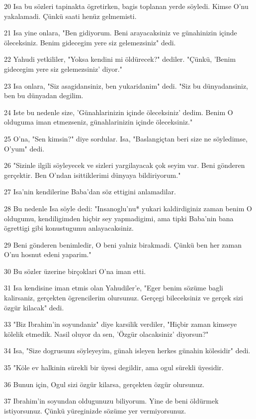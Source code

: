 \par 20 Isa bu sözleri tapinakta ögretirken, bagis toplanan yerde söyledi. Kimse O'nu yakalamadi. Çünkü saati henüz gelmemisti.
\par 21 Isa yine onlara, "Ben gidiyorum. Beni arayacaksiniz ve günahinizin içinde öleceksiniz. Benim gidecegim yere siz gelemezsiniz" dedi.
\par 22 Yahudi yetkililer, "Yoksa kendini mi öldürecek?" dediler. "Çünkü, 'Benim gidecegim yere siz gelemezsiniz' diyor."
\par 23 Isa onlara, "Siz asagidansiniz, ben yukaridanim" dedi. "Siz bu dünyadansiniz, ben bu dünyadan degilim.
\par 24 Iste bu nedenle size, 'Günahlarinizin içinde öleceksiniz' dedim. Benim O olduguma iman etmezseniz, günahlarinizin içinde öleceksiniz."
\par 25 O'na, "Sen kimsin?" diye sordular. Isa, "Baslangiçtan beri size ne söyledimse, O'yum" dedi.
\par 26 "Sizinle ilgili söyleyecek ve sizleri yargilayacak çok seyim var. Beni gönderen gerçektir. Ben O'ndan isittiklerimi dünyaya bildiriyorum."
\par 27 Isa'nin kendilerine Baba'dan söz ettigini anlamadilar.
\par 28 Bu nedenle Isa söyle dedi: "Insanoglu'nu* yukari kaldirdiginiz zaman benim O oldugumu, kendiligimden hiçbir sey yapmadigimi, ama tipki Baba'nin bana ögrettigi gibi konustugumu anlayacaksiniz.
\par 29 Beni gönderen benimledir, O beni yalniz birakmadi. Çünkü ben her zaman O'nu hosnut edeni yaparim."
\par 30 Bu sözler üzerine birçoklari O'na iman etti.
\par 31 Isa kendisine iman etmis olan Yahudiler'e, "Eger benim sözüme bagli kalirsaniz, gerçekten ögrencilerim olursunuz. Gerçegi bileceksiniz ve gerçek sizi özgür kilacak" dedi.
\par 33 "Biz Ibrahim'in soyundaniz" diye karsilik verdiler, "Hiçbir zaman kimseye kölelik etmedik. Nasil oluyor da sen, 'Özgür olacaksiniz' diyorsun?"
\par 34 Isa, "Size dogrusunu söyleyeyim, günah isleyen herkes günahin kölesidir" dedi.
\par 35 "Köle ev halkinin sürekli bir üyesi degildir, ama ogul sürekli üyesidir.
\par 36 Bunun için, Ogul sizi özgür kilarsa, gerçekten özgür olursunuz.
\par 37 Ibrahim'in soyundan oldugunuzu biliyorum. Yine de beni öldürmek istiyorsunuz. Çünkü yüreginizde sözüme yer vermiyorsunuz.
